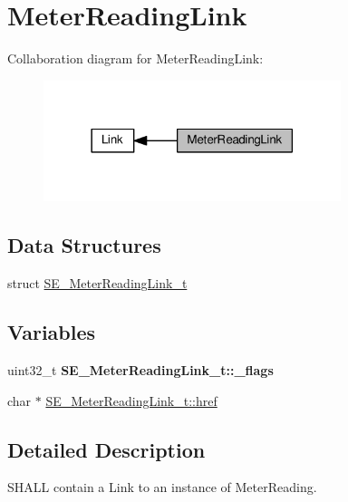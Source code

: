 \hypertarget{group__MeterReadingLink}{}\section{Meter\+Reading\+Link}
\label{group__MeterReadingLink}
Collaboration diagram for Meter\+Reading\+Link\+:\nopagebreak
\begin{figure}[H]
\begin{center}
\leavevmode
\includegraphics[width=246pt]{group__MeterReadingLink}
\end{center}
\end{figure}
\subsection*{Data Structures}
\begin{DoxyCompactItemize}
\item 
struct \hyperlink{structSE__MeterReadingLink__t}{S\+E\+\_\+\+Meter\+Reading\+Link\+\_\+t}
\end{DoxyCompactItemize}
\subsection*{Variables}
\begin{DoxyCompactItemize}
\item 
\mbox{\label{group__MeterReadingLink_ga88a58b1b0a1febbb3e8c484261abe8d6}} 
uint32\+\_\+t {\bfseries S\+E\+\_\+\+Meter\+Reading\+Link\+\_\+t\+::\+\_\+flags}
\item 
char $\ast$ \hyperlink{group__MeterReadingLink_gadbcaaeedbf94ec78074abb19f52acc8b}{S\+E\+\_\+\+Meter\+Reading\+Link\+\_\+t\+::href}
\end{DoxyCompactItemize}


\subsection{Detailed Description}
S\+H\+A\+LL contain a Link to an instance of Meter\+Reading. 

